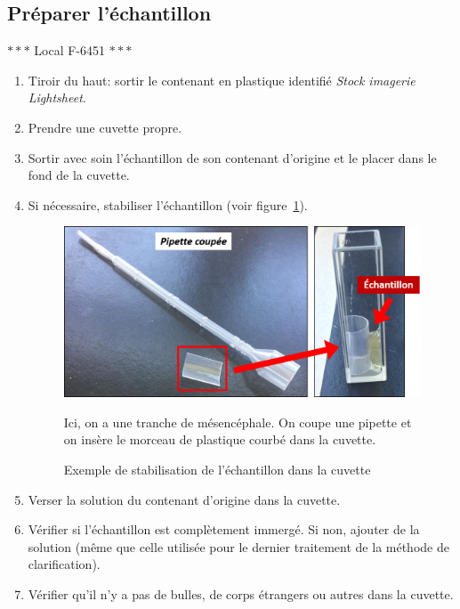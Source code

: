 \subsection{Préparer l'échantillon}
\begin{center} $\ast\ast\ast$ Local F-6451 $\ast\ast\ast$ \end{center}
\begin{enumerate}
    \item Tiroir du haut: sortir le contenant en plastique identifié \textit{Stock imagerie Lightsheet}.
    \item Prendre une cuvette propre.
    \item Sortir avec soin l'échantillon de son contenant d'origine et le placer dans le fond de la cuvette.
    \item Si nécessaire, stabiliser l'échantillon (voir figure~\ref{fig:pipette}).
        \begin{figure}[H]
        \begin{center} \includegraphics[width=13cm]{pipette.png} \end{center}
        \caption{Exemple de stabilisation de l'échantillon dans la cuvette}
        \begin{footnotesize} Ici, on a une tranche de mésencéphale. On coupe une pipette et on insère le morceau de plastique courbé dans la cuvette. \end{footnotesize}
        \label{fig:pipette}
        \end{figure}
    \item Verser la solution du contenant d'origine dans la cuvette.
    \item Vérifier si l'échantillon est complètement immergé. Si non, ajouter de la solution (même que celle utilisée pour le dernier traitement de la méthode de clarification).
    \item Vérifier qu'il n'y a pas de bulles, de corps étrangers ou autres dans la cuvette.

\end{enumerate}
